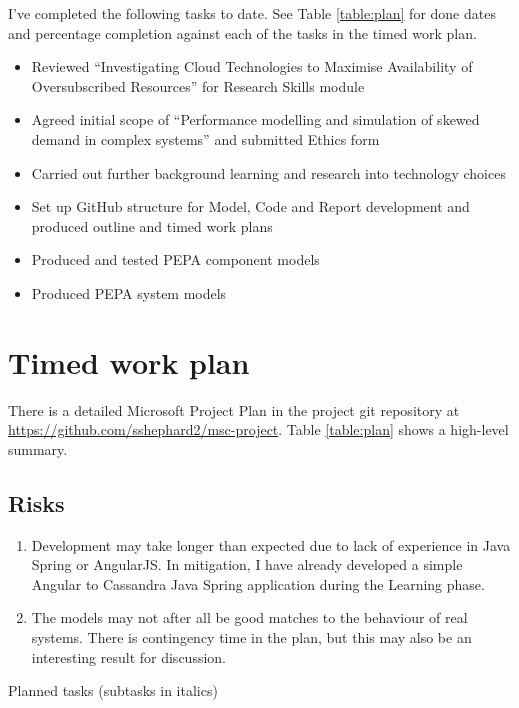 \documentclass{llncs}
\begin{document}
I've completed the following tasks to date. See Table \ref{table:plan} for done dates and percentage completion against each of the tasks in the timed work plan.
\begin{itemize}
	\item Reviewed ``Investigating Cloud Technologies to Maximise Availability of Oversubscribed Resources'' for Research Skills module
	\item Agreed initial scope of ``Performance modelling and simulation of skewed demand in complex systems'' and submitted Ethics form
	\item Carried out further background learning and research into technology choices
	\item Set up GitHub structure for Model, Code and Report development and produced outline and timed work plans
	\item Produced and tested PEPA component models
	\item Produced PEPA system models
\end{itemize}

%
%

\section{Timed work plan}

There is a detailed Microsoft Project Plan in the project git repository at \url{https://github.com/sshephard2/msc-project}.  Table \ref{table:plan} shows a high-level summary.

\subsection{Risks}
\begin{enumerate}
	\item Development may take longer than expected due to lack of experience in Java Spring or AngularJS.  In mitigation, I have already developed a simple Angular to Cassandra Java Spring application during the Learning phase.
	\item The models may not after all be good matches to the behaviour of real systems.  There is contingency time in the plan, but this may also be an interesting result for discussion.
\end{enumerate}

\begin{table}[h!]
	\begin{center}
		\caption{Planned tasks (subtasks in italics)}
		\label{table:plan}
	\end{center}
\end{table}


%
%

\newpage



\end{document}
